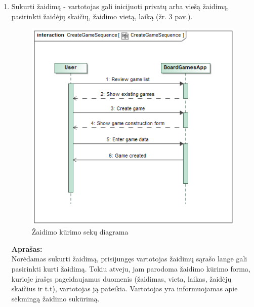 \documentclass{VUMIFPSkursinis}
\begin{document}
\begin{enumerate}
			\item Sukurti žaidimą - vartotojas gali inicijuoti privatų arba viešą 
			žaidimą, pasirinkti žaidėjų skaičių, žaidimo vietą, laiką (žr. 3 pav.).
				\begin{figure}[H]
					\centering
					\includegraphics[scale=0.5]{img/CreateGameSequence}
					\caption{Žaidimo kūrimo sekų diagrama}
					\label{img:CreateGameSequence}
				\end{figure}
				\textbf{Aprašas:}\\
					Norėdamas sukurti žaidimą, prisijungęs vartotojas žaidimų sąrašo 
					lange gali pasirinkti kurti žaidimą. Tokiu atveju, jam parodoma 
					žaidimo kūrimo forma, kurioje įrašęs pageidaujamus duomenis 
					(žaidimas, vieta, laikas, žaidėjų skaičius ir t.t), vartotojas ją 
					pateikia. Vartotojas yra informuojamas apie sėkmingą žaidimo sukūrimą.	
					

\end{enumerate}
\end{document}
